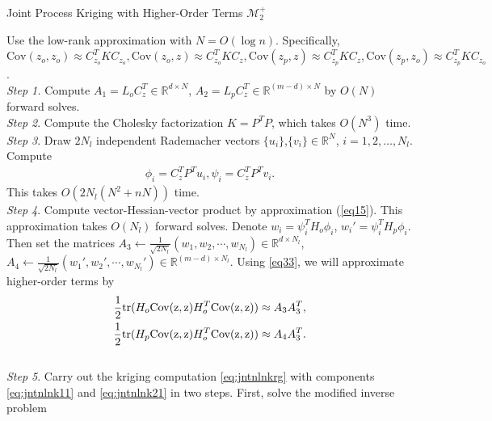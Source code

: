 \documentclass[article,ij4uq]{ij4uq}              %
\begin{document}
\begin{algorithm}[h!]
\caption{Joint Process Kriging with Higher-Order Terms $\mathcal{M}_{2}^{+}$}\label{alg:6}
Use the low-rank approximation with $N=O(\log{n})$. Specifically, $\mathrm{Cov}(z_{o},z_{o})\approx C_{z_{o}}^{T}KC_{z_{o}},\mathrm{Cov}(z_{o},z)\approx C_{z_{o}}^{T}KC_{z},\mathrm{Cov}(z_{p},z)\approx C_{z_{p}}^{T}KC_{z},\mathrm{Cov}(z_{p},z_{o})\approx C_{z_{p}}^{T}KC_{z_{o}}$.\\
\textit{Step 1.} Compute $A_{1}=L_{o}C_{z}^{T}\in\mathbb{R}^{d\times N}$, $A_{2}=L_{p}C_{z}^{T}\in\mathbb{R}^{(m-d)\times N}$ by $O(N)$ forward solves.\\
\textit{Step 2}. Compute the Cholesky factorization $K=P^{T}P$, which takes $O(N^{3})$ time.\\
\textit{Step 3}. Draw $2N_{l}$ independent Rademacher vectors $\{u_{i}\}$,$\{v_{i}\} \in \mathbb{R}^N$, $i=1,2,\ldots,N_l$. Compute
\begin{align}
    \phi_{i}=C_{z}^{T}P^{T}u_{i}, \psi_{i}=C_{z}^{T}P^{T}v_{i}.
\end{align}
This takes $O(2N_{l}(N^{2}+nN))$ time.\\
\textit{Step 4}. Compute vector-Hessian-vector product by approximation (\ref{eq15}). This approximation takes $O(N_{l})$ forward solves. Denote $w_{i}=\psi_{i}^{T}H_{o}\phi_{i}$, $w_{i}'=\psi_{i}^{T}H_{p}\phi_{i}$. Then set the matrices $A_{3}\gets \frac{1}{\sqrt{2N_{l}}}(w_{1},w_{2},\cdots,w_{N_{l}})\in\mathbb{R}^{d\times N_{l}}$, $A_{4}\gets \frac{1}{\sqrt{2N_{l}}}(w_{1}',w_{2}',\cdots,w_{N_{l}}')\in\mathbb{R}^{(m-d)\times N_{l}}$. Using \eqref{eq33}, we will approximate higher-order terms by
\begin{align}
    \frac{1}{2}{\rm{tr}}(H_{o}{\rm{Cov(z,z)}}H_{o}^{T}{\rm{Cov(z,z)}})\approx A_{3}A_{3}^{T},\\
    \frac{1}{2}{\rm{tr}}(H_{p}{\rm{Cov(z,z)}}H_{o}^{T}{\rm{Cov(z,z)}})\approx A_{4}A_{3}^{T}.
\end{align}\\
\textit{Step 5}. Carry out the kriging computation \eqref{eq:jntnlnkrg} with components \eqref{eq:jntnlnk11} and \eqref{eq:jntnlnk21} in two steps. First, solve the modified inverse problem
\begin{align}

\end{align}
\end{algorithm}
\end{document}
